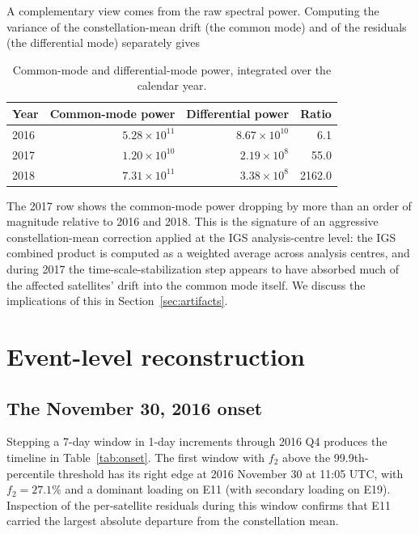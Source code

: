 \documentclass[11pt,a4paper]{article}
\begin{document}
A complementary view comes from the raw spectral power. Computing the variance of the constellation-mean drift (the common mode) and of the residuals (the differential mode) separately gives
\begin{table}[h]
    \centering
    \caption{Common-mode and differential-mode power, integrated over the calendar year.}
    \label{tab:power}
    \begin{tabular}{lrrr}
        \toprule
        Year & Common-mode power & Differential power & Ratio \\
        \midrule
        2016 & $5.28 \times 10^{11}$ & $8.67 \times 10^{10}$ & 6.1 \\
        2017 & $1.20 \times 10^{10}$ & $2.19 \times 10^{8}$ & 55.0 \\
        2018 & $7.31 \times 10^{11}$ & $3.38 \times 10^{8}$ & 2162.0 \\
        \bottomrule
    \end{tabular}
\end{table}

The 2017 row shows the common-mode power dropping by more than an order of magnitude relative to 2016 and 2018. This is the signature of an aggressive constellation-mean correction applied at the IGS analysis-centre level: the IGS combined product is computed as a weighted average across analysis centres, and during 2017 the time-scale-stabilization step appears to have absorbed much of the affected satellites' drift into the common mode itself. We discuss the implications of this in Section~\ref{sec:artifacts}.

\section{Event-level reconstruction}

\subsection{The November 30, 2016 onset}

Stepping a 7-day window in 1-day increments through 2016 Q4 produces the timeline in Table~\ref{tab:onset}. The first window with $f_2$ above the 99.9th-percentile threshold has its right edge at 2016 November 30 at 11:05 UTC, with $f_2 = 27.1\%$ and a dominant loading on E11 (with secondary loading on E19). Inspection of the per-satellite residuals during this window confirms that E11 carried the largest absolute departure from the constellation mean.
\end{document}
